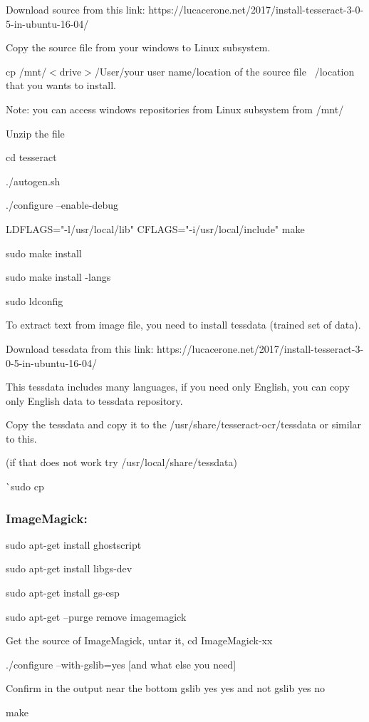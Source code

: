 \documentclass[article, onecolumn, draftclsnofoot,10pt, compsoc]{IEEEtran}
\begin{document}
Download source from this link: https://lucacerone.net/2017/install-tesseract-3-0-5-in-ubuntu-16-04/

Copy the source file from your windows to Linux subsystem.

cp /mnt/$<$drive$>$/User/your user name/location of the source file ~/location that you wants to install.

Note: you can access windows repositories from Linux subsystem from /mnt/

Unzip the file

cd tesseract

./autogen.sh

./configure --enable-debug

LDFLAGS="-l/usr/local/lib" CFLAGS="-i/usr/local/include" make

sudo make install

sudo make install -langs

sudo ldconfig

To extract text from image file, you need to install tessdata (trained set of data).

Download tessdata from this link: https://lucacerone.net/2017/install-tesseract-3-0-5-in-ubuntu-16-04/

This tessdata includes many languages, if you need only English, you can copy only English data to tessdata repository.

Copy the tessdata and copy it to the /usr/share/tesseract-ocr/tessdata or similar to this.

(if that does not work try /usr/local/share/tessdata)

^^ sudo cp 

\subsubsection{ImageMagick:}

sudo apt-get install ghostscript

sudo apt-get install libgs-dev

sudo apt-get install gs-esp

sudo apt-get --purge remove imagemagick

Get the source of ImageMagick, untar it, cd ImageMagick-xx

./configure --with-gslib=yes [and what else you need]

Confirm in the output near the bottom gslib yes yes and not gslib yes no

make
\end{document}
